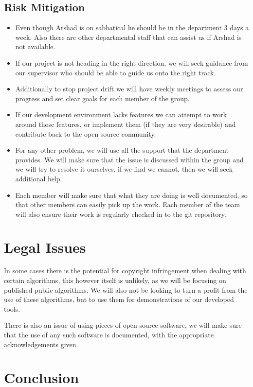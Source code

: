 \documentclass[a4paper]{article}
\begin{document}
\subsection{Risk Mitigation}
\begin{itemize}
	\item Even though Arshad is on sabbatical he should be in the department
3 days a week. Also there are other departmental staff that can assist us if
Arshad is not available.
	\item If our project is not heading in the right direction, we will seek
guidance from our supervisor who should be able to guide us onto the right
track.
	\item Additionally to stop project drift we will have weekly meetings to
assess our progress and set clear goals for each member of the group.
	\item If our development environment lacks features we can attempt to
work around those features, or implement them (if they are very desirable) and
contribute back to the open source community.
	\item For any other problem, we will use all the support that the
department provides. We will make sure that the issue is discussed within the
group and we will try to resolve it ourselves. if we find we cannot, then we
will seek additional help.
	\item Each member will make sure that what they are doing is well
documented, so that other members can easily pick up the work. Each member of
the team will also ensure their work is regularly checked in to the git
repository.
\end{itemize}


\section{Legal Issues}
In some cases there is the potential for copyright infringement when dealing
with certain algorithms, this however itself is unlikely, as we will be focusing
on published public algorithms. We will also not be looking to turn a profit
from the use of these algorithms, but to use them for demonstrations of our
developed tools.

There is also an issue of using pieces of open source software, we will make
sure that the use of any such software is documented, with the appropriate
acknowledgements given.

\section{Conclusion}
\end{document}
